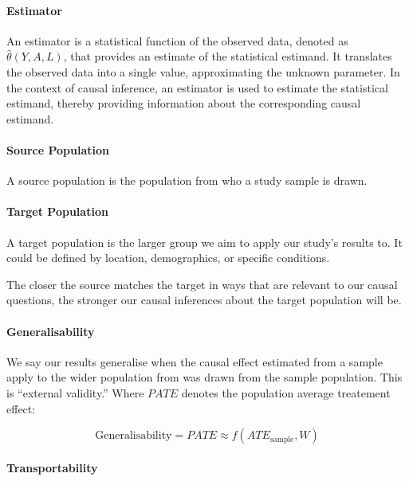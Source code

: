 \documentclass[
  singlecolumn]{article}
\let\oldparagraph\paragraph
\renewcommand{\paragraph}[1]{\oldparagraph{#1}\mbox{}}
\begin{document}
\paragraph{\texorpdfstring{\textbf{Estimator}}{Estimator}}\label{estimator}

An estimator is a statistical function of the observed data, denoted as
\(\hat{\theta}(Y, A, L)\), that provides an estimate of the statistical
estimand. It translates the observed data into a single value,
approximating the unknown parameter. In the context of causal inference,
an estimator is used to estimate the statistical estimand, thereby
providing information about the corresponding causal estimand.

\paragraph{\texorpdfstring{\textbf{Source
Population}}{Source Population}}\label{source-population}

A source population is the population from who a study sample is drawn.

\paragraph{\texorpdfstring{\textbf{Target
Population}}{Target Population}}\label{target-population}

A target population is the larger group we aim to apply our study's
results to. It could be defined by location, demographics, or specific
conditions.

The closer the source matches the target in ways that are relevant to
our causal questions, the stronger our causal inferences about the
target population will be.

\paragraph{\texorpdfstring{\textbf{Generalisability}}{Generalisability}}\label{generalisability}

We say our results generalise when the causal effect estimated from a
sample apply to the wider population from was drawn from the sample
population. This is ``external validity.'' Where \(PATE\) denotes the
population average treatement effect:

\[\text{Generalisability} = PATE \approx f(ATE_{\text{sample}}, W)\]

\paragraph{\texorpdfstring{\textbf{Transportability}}{Transportability}}\label{transportability}
\end{document}
